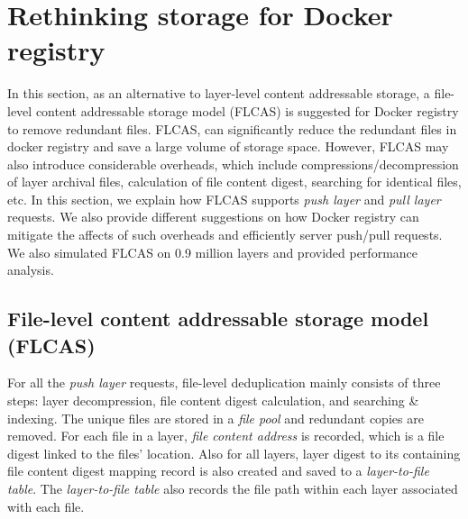 \section{Rethinking storage for Docker registry}
\label{sec:file_adressable}
In this section, as an alternative to layer-level content addressable storage,
a file-level content addressable storage model (FLCAS) is suggested for Docker
registry to remove redundant files. %
FLCAS, can significantly reduce the redundant files in docker registry and save
a large volume of storage space. However, FLCAS may also introduce considerable
overheads, which include compressions/decompression of layer archival files,
calculation of file content digest, searching for identical files, etc. In this
section, we explain how FLCAS supports \emph{push layer} and \emph{pull layer}
requests. We also
provide different suggestions on how Docker registry can mitigate
the affects of such overheads and efficiently server push/pull requests. We
also simulated FLCAS on 0.9 million layers and provided performance analysis.

\subsection{File-level content addressable storage model (FLCAS)}
For all the \emph{push layer} requests, file-level deduplication mainly
consists of three steps: layer decompression, file content digest calculation,
and searching \& indexing. The unique files are stored in a \textit{file pool}
and redundant copies are removed. 
For each file in a layer, \textit{file content address} is recorded, which is a
file digest linked to the files' location.  Also for all layers, layer digest
to its containing file content digest mapping record is also created and saved
to a \textit{layer-to-file table}. The \textit{layer-to-file table} also
records the file path within each layer associated with each file.

